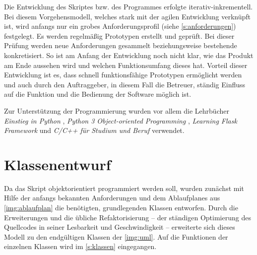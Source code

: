 \documentclass[a4paper,12pt,bibliography=totoc, listof=totoc,titlepage,pointlessnumbers]{scrreprt}
\begin{document}
Die Entwicklung des Skriptes bzw. des Programmes erfolgte iterativ-inkrementell. Bei diesem Vorgehensmodell, welches stark mit der agilen Entwicklung verknüpft ist, wird anfangs nur ein grobes Anforderungsprofil (siehe \autoref{s:anforderungen}) festgelegt. Es werden re\-gel\-mä\-ßig Prototypen erstellt und geprüft. Bei dieser Prüfung werden neue Anforderungen gesammelt beziehungsweise bestehende konkretisiert. So ist am Anfang der Entwicklung noch nicht klar, wie das Produkt am Ende aussehen wird und welchen Funktionsumfang dieses hat. Vorteil dieser Entwicklung ist es, dass schnell funktionsfähige Prototypen ermöglicht werden und auch durch den Auftraggeber, in diesem Fall die Betreuer, ständig Einfluss auf die Funktion und die Bedienung der Software möglich ist. \citep[S. 33f]{uml}

Zur Unterstützung der Programmierung wurden vor allem die Lehrbücher \textit{Einstieg in Python} \citep{python}, \textit{Python 3 Object-oriented Programming} \citep{python3oop}, \textit{Learning Flask Framework} \citep{flask} und \textit{C/C++ für Studium und Beruf} \citep{cpp} verwendet.

\section{Klassenentwurf}
Da das Skript objektorientiert programmiert werden soll, wurden zunächst mit Hilfe der anfangs bekannten Anforderungen und dem Ablaufplanes aus \autoref{img:ablaufplan} die benötigten, grundlegenden Klassen entworfen. Durch die Erweiterungen und die übliche Refaktorisierung -- der ständigen Optimierung des Quellcodes in seiner Lesbarkeit und Geschwindigkeit \citep[S. 255]{uml} -- erweiterte sich dieses Modell zu den endgültigen Klassen der \autoref{img:uml}. Auf die Funktionen der einzelnen Klassen wird im \autoref{s:klassen} eingegangen.
\end{document}
